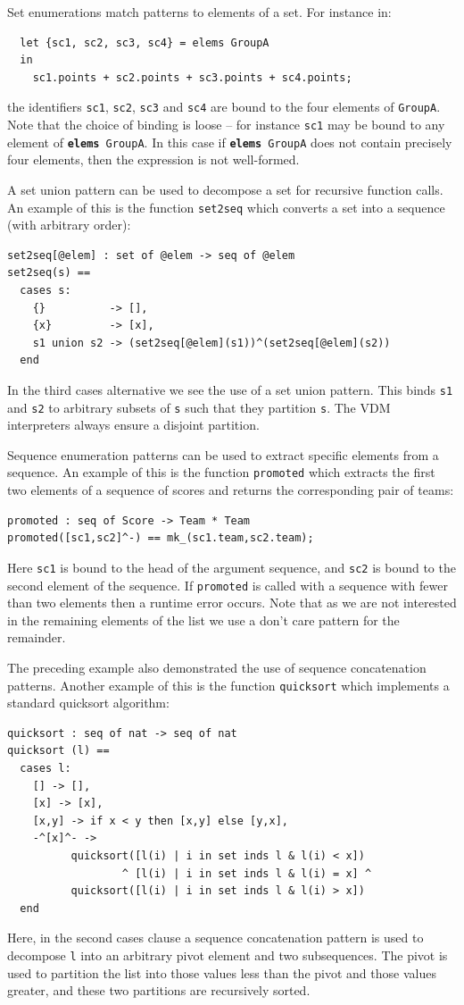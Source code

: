 \documentclass{overturerepchap}
\newcommand{\keyw}[1]{{\bf\ttfamily #1}}
\begin{document}
{\begin{description}
Set enumerations match patterns to elements of a set. For instance in:
\begin{lstlisting}
  let {sc1, sc2, sc3, sc4} = elems GroupA
  in
    sc1.points + sc2.points + sc3.points + sc4.points;
\end{lstlisting}
the identifiers \texttt{sc1}, \texttt{sc2}, \texttt{sc3} and
\texttt{sc4} are bound to the four elements of \texttt{GroupA}. Note
that the choice of binding is loose -- for instance
\texttt{sc1} may be bound to any element of \texttt{\keyw{elems}
GroupA}. In this case if \texttt{\keyw{elems} GroupA} does not contain
precisely four elements, then the expression is not well-formed.

A set union pattern can be used to decompose a set for recursive
function calls. An example of this is the function \texttt{set2seq}
which converts a set into a sequence (with arbitrary order):
\begin{lstlisting}
set2seq[@elem] : set of @elem -> seq of @elem
set2seq(s) ==
  cases s:
    {}          -> [],
    {x}         -> [x],
    s1 union s2 -> (set2seq[@elem](s1))^(set2seq[@elem](s2))
  end
\end{lstlisting}
In the third cases alternative we see the use of a set union pattern. This
binds \texttt{s1} and \texttt{s2} to arbitrary subsets of \texttt{s}
such that they partition \texttt{s}. The VDM interpreters always
ensure a disjoint partition.

Sequence enumeration patterns can be used to extract specific elements
from a sequence. An example of this is the function \texttt{promoted}
which extracts the first two elements of a sequence of scores and
returns the corresponding pair of teams:
\begin{lstlisting}
promoted : seq of Score -> Team * Team
promoted([sc1,sc2]^-) == mk_(sc1.team,sc2.team);
\end{lstlisting}
Here \texttt{sc1} is bound to the head of the argument sequence, and
\texttt{sc2} is bound to the second element of the sequence. If
\texttt{promoted} is called with a sequence with fewer than two
elements then a runtime error occurs. Note that as we are not
interested in the remaining elements of the list we use a don't care
pattern for the remainder.

The preceding example also demonstrated the use of sequence
concatenation patterns. Another example of this is the function
\texttt{quicksort} which implements a standard quicksort algorithm:
\begin{lstlisting}
quicksort : seq of nat -> seq of nat
quicksort (l) ==
  cases l:
    [] -> [],
    [x] -> [x],
    [x,y] -> if x < y then [x,y] else [y,x],
    -^[x]^- ->
          quicksort([l(i) | i in set inds l & l(i) < x])
                  ^ [l(i) | i in set inds l & l(i) = x] ^
          quicksort([l(i) | i in set inds l & l(i) > x])
  end
\end{lstlisting}
Here, in the second cases clause a sequence concatenation pattern is
used to decompose \texttt{l} into an arbitrary pivot element and two
subsequences. The pivot is used to partition the list into those
values less than the pivot and those values greater, and these two
partitions are recursively sorted.



\end{description}}
\end{document}
